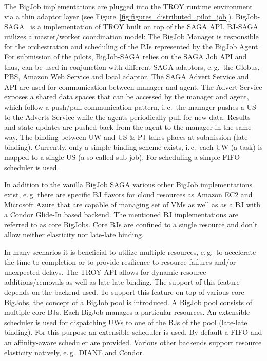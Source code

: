 \documentclass[conference,final]{IEEEtran}
\begin{document}
	


The BigJob implementations are plugged into the TROY runtime environment via a
thin adaptor layer (see Figure~\ref{fig:figures_distributed_pilot_job}).
BigJob-SAGA~\cite{saga_bigjob_condor_cloud} is a implementation of TROY built on
top of the SAGA API. BJ-SAGA utilizes a master/worker coordination model:
The BigJob Manager is responsible for the orchestration and scheduling of the
PJs represented by the BigJob Agent. For submission of the pilots, BigJob-SAGA
relies on the SAGA Job API and thus, can be used in conjunction with different
SAGA adaptors, e.\,g.\ the Globus, PBS, Amazon Web Service and local adaptor.
The SAGA Advert Service and API are used for communication between manager and
agent. The Advert Service exposes a shared data spaces that can be accessed by
the manager and agent, which follow a push/pull communication pattern, i.\,e.\
the manager pushes a US to the Adverts Service while the agents periodically
pull for new data. Results and state updates are pushed back from the agent to
the manager in the same way. The binding between UW and US \& PJ takes places at
submission (late binding). Currently, only a simple binding scheme exists,
i.\,e.\ each UW (a task) is mapped to a single US (a so called sub-job). For
scheduling a simple FIFO scheduler is used.

In addition to the vanilla BigJob SAGA various other BigJob implementations
exist, e.\,g. there are specific BJ flavors for cloud resources as Amazon EC2
and Microsoft Azure that are capable of managing set of VMs as well as as a BJ
with a Condor Glide-In based backend. The mentioned BJ implementations are referred to
as core BigJobs. Core BJs are confined to a single resource and don't allow
neither elasticity nor late-late binding.


In many scenarios it is beneficial to utilize multiple resources, e.\,g.\ to
accelerate the time-to-completion or to provide resilience to resource failures
and/or unexpected delays. The TROY API allows for dynamic resource
additions/removals as well as late-late binding. The support of this feature
depends on the backend used. To support this feature on top of various core
BigJobs, the concept of a BigJob pool is introduced. A BigJob pool consists of
multiple core BJs. Each BigJob manages a particular resources. An extensible
scheduler is used for dispatching UWs to one of the BJs of the pool (late-late
binding). For this purpose an extensible scheduler is used. By default a FIFO
and an affinity-aware scheduler are provided. Various other backends support
resource elasticity natively, e.\,g.\ DIANE and Condor. 
\end{document}
